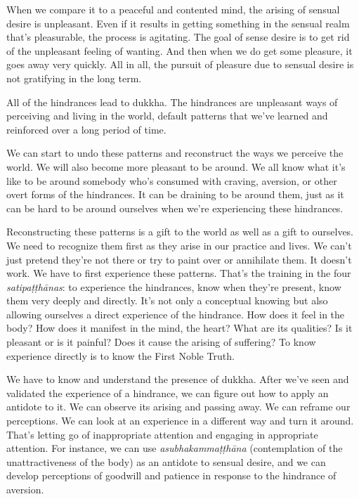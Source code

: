 When we compare it to a peaceful and contented mind, the arising of sensual desire is unpleasant. Even if it results in getting something in the sensual realm that's pleasurable, the process is agitating. The goal of sense desire is to get rid of the unpleasant feeling of wanting. And then when we do get some pleasure, it goes away very quickly. All in all, the pursuit of pleasure due to sensual desire is not gratifying in the long term.

All of the hindrances lead to dukkha. The hindrances are unpleasant ways of perceiving and living in the world, default patterns that we've learned and reinforced over a long period of time.

We can start to undo these patterns and reconstruct the \linebreak ways we perceive the world. We will also become more pleasant to be around. We all know what it's like to be around somebody who's consumed with craving, aversion, or other overt forms of the hindrances. It can be draining to be around them, just as it can be hard to be around ourselves when we're experiencing these hindrances.

Reconstructing these patterns is a gift to the world as \linebreak well as a gift to ourselves. We need to recognize them first as they arise in our practice and lives. We can't just pretend they're not there or try to paint over or annihilate them. It doesn't work. We have to first experience these patterns. That's the training in the four \emph{satipaṭṭhānas}: to experience the hindrances, know when they're present, know them very deeply and directly. It's not only a conceptual knowing but also allowing ourselves a direct experience of the hindrance. How does it feel in the body? How does it manifest in the mind, the heart? What are its qualities? Is it pleasant or is it painful? Does it cause the arising of suffering? To know experience directly is to know the First Noble Truth.

We have to know and understand the presence of dukkha. After we've seen and validated the experience of a hindrance, we can figure out how to apply an antidote to it. We can observe its arising and passing away. We can reframe our perceptions. We can look at an experience in a different way and turn it around. That's letting go of inappropriate attention and engaging in appropriate attention. For instance, we can use \emph{asubhakammaṭṭhāna} (contemplation of the unattractiveness of the body) as an antidote to sensual desire, and we can develop perceptions of goodwill and patience in response to the hindrance of aversion.

